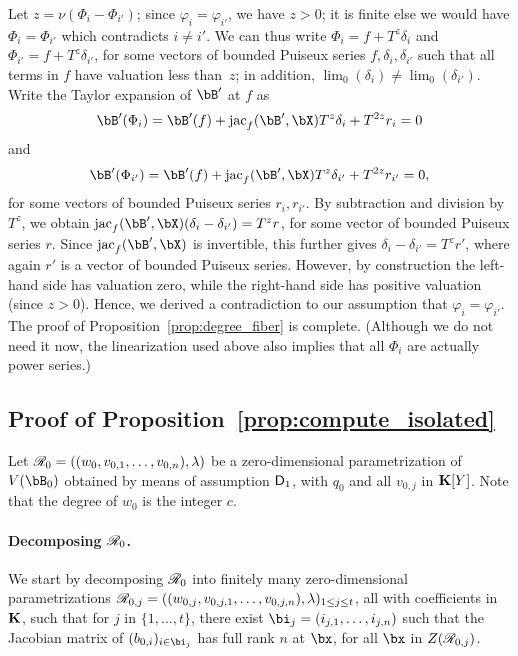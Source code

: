 \documentclass[12pt]{article}
\begin{document}
Let $z=\nu(\Phi_i-\Phi_{i'})$; since $\varphi_i = \varphi_{i'}$, we
have $z > 0$; it is finite else we would have $\Phi_i=\Phi_{i'}$ which
contradicts $i\neq i'$. We can thus write $\Phi_i=f + T^z
\delta_i$ and $\Phi_{i'}=f + T^z
\delta_{i'}$, for some vectors of bounded Puiseux series $f, \delta_i,
\delta_{i'}$ such that all terms in $f$ have valuation less
than~$z$;
in addition, $\lim_0(\delta_i)
\ne \lim_0(\delta_{i'})$. Write the Taylor expansion of $\bB'$ at
$f$ as
$$\bB'(\Phi_i) = \bB'(f) + \jac_f(\bB',\bX) T^z \delta_i + T^{2z} r_i =0$$
and
$$\bB'(\Phi_{i'}) = \bB'(f) + \jac_f(\bB',\bX) T^z \delta_{i'} + T^{2z}
r_{i'} =0,$$ for some vectors of bounded Puiseux series $r_i,r_{i'}$.
By subtraction and division by $T^z$, we obtain $\jac_f(\bB',\bX)
(\delta_i-\delta_{i'}) = T^z r$, for some vector of bounded Puiseux
series $r$.  Since $\jac_f(\bB',\bX)$ is invertible, this further gives
$\delta_i-\delta_{i'} = T^z r'$, where again $r'$ is a vector of
bounded Puiseux series.  However, by construction the left-hand side
has valuation zero, while the right-hand side has positive valuation
(since $z > 0$). Hence, we derived a contradiction to our assumption
that $\varphi_i = \varphi_{i'}$. The proof of Proposition~\ref{prop:degree_fiber} is
complete. (Although we do not need it now, the linearization
used above also implies that all $\Phi_i$ are actually power series.)


\subsection{Proof of Proposition~\ref{prop:compute_isolated}} \label{proof:prop2}

Let $\mathscr{R}_0 =((w_{0},v_{0,1},\dots,v_{0,n}),\lambda)$ be a
zero-dimensional parametrization of $V(\bB_{0})$ obtained by means of
assumption $\mathsf{D}_1$, with $q_0$ and all $v_{0,j}$ in $\mathbf{K}[Y]$. Note
that the degree of $w_0$ is the integer $c$.

\paragraph{Decomposing $\mathscr{R}_0$.}
We start by decomposing $\mathscr{R}_0$ into finitely many zero-dimensional
parametrizations
$\mathscr{R}_{0,j}=((w_{0,j},v_{0,j,1},\dots,v_{0,j,n}),\lambda)_{1\le j\le
  t}$, all with coefficients in $\mathbf{K}$, such that for $j$ in
$\{1,\dots,t\}$, there exist $\bi_j=(i_{j,1},\dots,i_{j,n})$ such that
the Jacobian matrix of $(b_{0,i})_{i \in \bi_j}$ has full rank $n$ at
$\bx$, for all $\bx$ in $Z(\mathscr{R}_{0,j})$.
\end{document}
